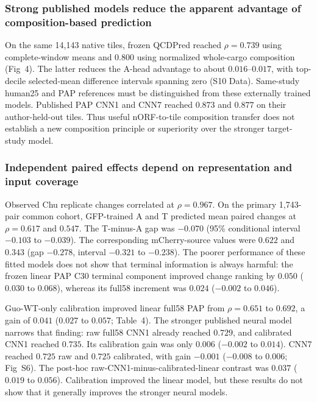 \documentclass[11pt,a4paper]{article}
\begin{document}
\subsubsection{Strong published models reduce the apparent advantage of composition-based prediction}
On the same 14,143 native tiles, frozen QCDPred reached $\rho=0.739$ using
complete-window means and $0.800$ using normalized whole-cargo composition
(Fig~4). The latter reduces the A-head advantage to about
$0.016$--$0.017$, with top-decile selected-mean difference intervals spanning
zero (S10 Data). Same-study human25 and PAP references must be distinguished
from these externally trained models. Published PAP CNN1 and CNN7 reached
$0.873$ and $0.877$ on their author-held-out tiles. Thus useful nORF-to-tile
composition transfer does not establish a new composition principle or
superiority over the stronger target-study model.



\subsubsection{Independent paired effects depend on representation and input coverage}
Observed Chu replicate changes correlated at $\rho=0.967$. On the primary
1,743-pair common cohort, GFP-trained A and T predicted mean paired changes
at $\rho=0.617$ and $0.547$. The T-minus-A gap was $-0.070$ (95\% conditional
interval $-0.103$ to $-0.039$). The corresponding mCherry-source values were
$0.622$ and $0.343$ (gap $-0.278$, interval $-0.321$ to $-0.238$).
The poorer performance of these fitted models does not show that terminal information is always harmful: the frozen linear PAP C30 terminal component improved change
ranking by $0.050$ ($0.030$ to $0.068$), whereas its full58 increment was
$0.024$ ($-0.002$ to $0.046$).

Guo-WT-only calibration improved linear full58 PAP from $\rho=0.651$ to
$0.692$, a gain of $0.041$ ($0.027$ to $0.057$; Table~4).
The stronger published neural model narrows that finding: raw full58 CNN1
already reached $0.729$, and calibrated CNN1 reached $0.735$. Its calibration
gain was only $0.006$ ($-0.002$ to $0.014$). CNN7 reached $0.725$ raw and
$0.725$ calibrated, with gain $-0.001$ ($-0.008$ to $0.006$;
Fig~S6). The post-hoc raw-CNN1-minus-calibrated-linear
contrast was $0.037$ ($0.019$ to $0.056$). Calibration improved the linear model, but these results do not show that it generally improves the stronger neural models.
\end{document}

